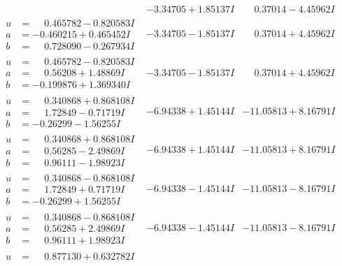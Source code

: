 \documentclass[1p]{elsarticle_modified}
\theoremstyle{definition}
\begin{document}
$$\begin{array}{c|c|c}
 & -3.34705 + 1.85137 I & \phantom{-}0.37014 - 4.45962 I \\ \hline\begin{aligned}
u &= \phantom{-}0.465782 - 0.820583 I \\
a &= -0.460215 + 0.465452 I \\
b &= \phantom{-}0.728090 - 0.267934 I\end{aligned}
 & -3.34705 - 1.85137 I & \phantom{-}0.37014 + 4.45962 I \\ \hline\begin{aligned}
u &= \phantom{-}0.465782 - 0.820583 I \\
a &= \phantom{-}0.56208 + 1.48869 I \\
b &= -0.199876 + 1.369340 I\end{aligned}
 & -3.34705 - 1.85137 I & \phantom{-}0.37014 + 4.45962 I \\ \hline\begin{aligned}
u &= \phantom{-}0.340868 + 0.868108 I \\
a &= \phantom{-}1.72849 - 0.71719 I \\
b &= -0.26299 - 1.56255 I\end{aligned}
 & -6.94338 + 1.45144 I & -11.05813 + 8.16791 I \\ \hline\begin{aligned}
u &= \phantom{-}0.340868 + 0.868108 I \\
a &= \phantom{-}0.56285 - 2.49869 I \\
b &= \phantom{-}0.96111 - 1.98923 I\end{aligned}
 & -6.94338 + 1.45144 I & -11.05813 + 8.16791 I \\ \hline\begin{aligned}
u &= \phantom{-}0.340868 - 0.868108 I \\
a &= \phantom{-}1.72849 + 0.71719 I \\
b &= -0.26299 + 1.56255 I\end{aligned}
 & -6.94338 - 1.45144 I & -11.05813 - 8.16791 I \\ \hline\begin{aligned}
u &= \phantom{-}0.340868 - 0.868108 I \\
a &= \phantom{-}0.56285 + 2.49869 I \\
b &= \phantom{-}0.96111 + 1.98923 I\end{aligned}
 & -6.94338 - 1.45144 I & -11.05813 - 8.16791 I \\ \hline\begin{aligned}
u &= \phantom{-}0.877130 + 0.632782 I \\

\end{aligned}
\end{array}$$
\end{document}
